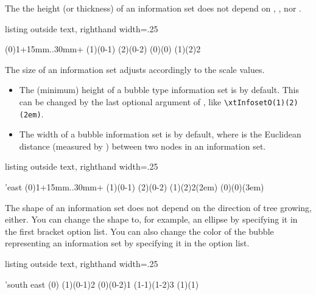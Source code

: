 The the height (or thickness) of an information set does not depend on , , nor .

\begin{tcblisting}{listing outside text, righthand width=.25\linewidth}
\begin{istgame}[xscale=1.2,yscale=.7]
\istroot(0){1}+15mm..30mm+
    \endist
\istroot(1)(0-1)      \endist
\istroot(2)(0-2)    \endist
\xtInfosetO(0)(0)
\xtInfosetO(1)(2){2}
\end{istgame}
\end{tcblisting}

The size of an information set adjusts accordingly to the scale values.

\remark 

\begin{itemize}\firmlist
\item The (minimum) height of a bubble type information set is \xw{1em} by default. This can be changed by the last optional argument of \cmd{\xtInfosetO}, like \verb+\xtInfosetO(1)(2)(2em)+.
\item The width of a bubble information set is  by default, 
where  is the Euclidean distance (measured by \TikZ) between two nodes in an information set.
\end{itemize}


\begin{tcblisting}{listing outside text, righthand width=.25\linewidth}
\begin{istgame}
\setistgrowdirection'{east}
\istroot(0){1}+15mm..30mm+
    \endist
\istroot(1)(0-1)      \endist
\istroot(2)(0-2)    \endist
\xtInfosetO[fill=blue!20,minimum width=\n1+3em]
           (1)(2){2}(2em)
\xtInfosetO(0)(0)(3em)
\end{istgame}
\end{tcblisting}

The shape of an information set does not depend on the direction of tree growing, either.
You can change the shape to, for example, an ellipse by specifying it in the first bracket option list.
You can also change the color of the bubble representing an information set by specifying it in the option list.

\begin{tcblisting}{listing outside text, righthand width=.25\linewidth}
\begin{istgame}[yscale=1.5]
\setistgrowdirection'{south east}
\istroot(0)    \istb \istb* \endist
\istroot(1)(0-1){2}  \istb* \istb* \endist
{}
\xtInfosetO(0)(0-2){1}
\xtInfosetO(1-1)(1-2){3}
\setxtinfosetstyle %
\xtInfosetO(1)(1)
\end{istgame}
\end{tcblisting}

